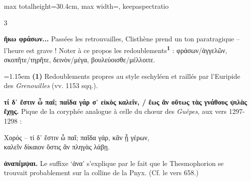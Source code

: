 \documentclass[11pt,twoside]{book}
\newcommand{\currHeadLE}{}
\newcommand{\currHeadRE}{}
\newcommand{\currHeadLO}{}
\newcommand{\currHeadRO}{}
\newcommand{\italique}[1]{\textit{#1}}
\newcommand{\citComm}[1]{\begin{quoting}[vskip=0.4pt,leftmargin=0.7em,rightmargin=0.2em]#1\end{quoting}}
\newcommand{\R}{\textbf{R}}
\newcommand{\marqueur}[1]{\textsuperscript{\color{rubricRed}\textbf{#1}}}
\begin{document}
\begin{adjustbox}{max totalheight=30.4cm, max width=\textwidth, keepaspectratio}
\begin{minipage}{\textwidth}
{\begin{multicols}{3}
\par\vspace{1.5pt}
 \textbf{ἥκω φράσων...} Passées les retrouvailles, Clisthène prend un ton paratragique -- l'heure est grave ! Noter à ce propos les redoublements\marqueur{1} : φράσων/ἀγγελῶν, σκοπῆτε/τηρῆτε, δεινὸν/μέγα, βουλεύοισθε/μέλλοιτε.
\par\vspace{1.5pt}
\par\vspace{1.2pt}\par\nopagebreak\vspace{1pt}\noindent\hangindent=1.15em {\color{sepiaNote}\textbf{(1)}} Redoublements propres au style eschyléen et raillés par l'Euripide des \italique{Grenouilles} (vv. 1153 sqq.).
\par\vspace{1.5pt}
 \textbf{τί δ᾽ ἔστιν ὦ παῖ; παῖδα γάρ σ᾽ εἰκὸς καλεῖν, /	ἕως ἂν οὕτως τὰς γνάθους ψιλὰς ἔχῃς.} Pique de la coryphée analogue à celle du chœur des \italique{Guêpes}, aux vers 1297-1298 :
\citComm{Χορός – τί δ᾽ ἔστιν ὦ παῖ; παῖδα γάρ, κἂν ᾖ γέρων,\\
καλεῖν δίκαιον ὅστις ἂν πληγὰς λάβῃ.}
\par\vspace{1.5pt}
 \textbf{ἀναπέμψαι.} Le suffixe `ἀνα' s'explique par le fait que le Thesmophorion se trouvait probablement sur la colline de la Pnyx. (Cf. le vers 658.)
\par\end{multicols}}
\end{minipage}\end{adjustbox}
\clearpage\ifodd\value{page}\hbox{}\newpage\fi
\renewcommand{\currHeadLE}{ΑΡΙΣΤΟΦΑΝΟΥΣ ΘΕΣΜΟΦΟΡΙΑΖΟΥΣΑΙ · CODEX RAVENNAS 429 (\R)}
\renewcommand{\currHeadRE}{Folio f. 169v (Classense 171v) · vv. 590–634}
\renewcommand{\currHeadLO}{FAC-SIMILÉ DU CODEX RAVENNAS 429 (\R) · f. 169v (Classense 171v)}
\renewcommand{\currHeadRO}{vv. 590–634 · Planche recadrée sur la zone écrite et harmonisée}
\end{document}
